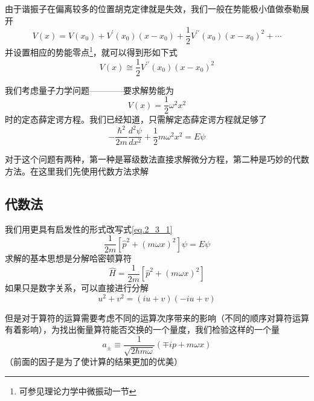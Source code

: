 	由于谐振子在偏离较多的位置胡克定律就是失效，我们一般在势能极小值做泰勒展开
	\begin{equation}
		V(x)=V\left(x_{0}\right)+V^{\prime}\left(x_{0}\right)\left(x-x_{0}\right)+\frac{1}{2} V^{\prime \prime}\left(x_{0}\right)\left(x-x_{0}\right)^{2}+\cdots
	\end{equation}
	并设置相应的势能零点\footnote{可参见理论力学中微振动一节}，就可以得到形如下式
	\begin{equation}
		V(x) \cong \frac{1}{2} V^{\prime \prime}\left(x_{0}\right)\left(x-x_{0}\right)^{2}
	\end{equation}

	我们考虑量子力学问题————要求解势能为
	\begin{equation}
		V(x)=\frac{1}{2} \omega^{2} x^{2}
	\end{equation}
	时的定态薛定谔方程。我们已经知道，只需解定态薛定谔方程就足够了
	\begin{equation}
	\label{eq.2_3_1}
		-\frac{\hbar^{2}}{2 m} \frac{d^{2} \psi}{d x^{2}}+\frac{1}{2} m \omega^{2} x^{2}=E \psi
	\end{equation}

	对于这个问题有两种，第一种是幂级数法直接求解微分方程，第二种是巧妙的代数方法。在这里我们先使用代数方法求解

	\subsection{代数法}
		我们用更具有启发性的形式改写式\ref{eq.2_3_1}
		\begin{equation}
			\frac{1}{2 m}\left[\hat{p}^{2}+(m \omega x)^{2}\right] \psi=E \psi
		\end{equation}
		求解的基本思想是分解哈密顿算符
		\begin{equation}
			\hat{H}=\frac{1}{2 m}\left[\hat{p}^{2}+(m \omega x)^{2}\right]
		\end{equation}
		如果只是数字关系，可以直接进行分解
		\begin{equation}
			u^{2}+v^{2}=(i u+v)(-i u+v)
		\end{equation}

		但是对于算符的运算需要考虑不同的运算次序带来的影响（不同的顺序对算符运算有着影响），为找出衡量算符能否交换的一个量度，我们检验这样的一个量
		\begin{equation}
			a_{\pm} \equiv \frac{1}{\sqrt{2 \hbar m \omega}}(\mp i p+m \omega x)
		\end{equation}
		（前面的因子是为了使计算的结果更加的优美）

